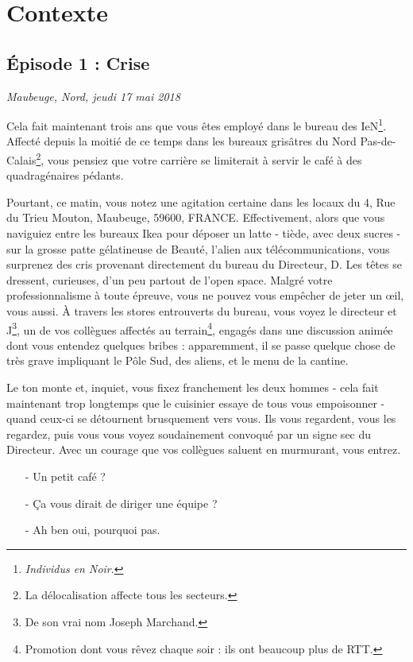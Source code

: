 \newpage

\section{Contexte}
\subsection{Épisode 1 : Crise}
\hfill \textit{Maubeuge, Nord, jeudi 17 mai 2018}

Cela fait maintenant trois ans que vous êtes employé dans le bureau des
IeN\footnote{\emph{Individus en Noir}\texttrademark.}.  Affecté depuis la moitié
de ce temps dans les bureaux grisâtres du Nord Pas-de-Calais\footnote{La
délocalisation affecte tous les secteurs.}, vous pensiez que votre carrière se
limiterait à servir le café à des quadragénaires pédants. 

Pourtant, ce matin, vous notez une agitation certaine dans les locaux du 4, Rue
du Trieu Mouton, Maubeuge, 59600, FRANCE.  Effectivement, alors que vous
naviguiez entre les bureaux Ikea pour déposer un latte - tiède, avec deux sucres
- sur la grosse patte gélatineuse de Beauté, l'alien aux télécommunications,
vous surprenez des cris provenant directement du bureau du Directeur, D. Les
têtes se dressent, curieuses, d'un peu partout de l'open space. Malgré votre
professionnalisme à toute épreuve, vous ne pouvez vous empêcher de jeter un œil,
vous aussi. À travers les stores entrouverts du bureau, vous voyez le directeur
et J\footnote{De son vrai nom Joseph Marchand.}, un de vos collègues affectés au
terrain\footnote{Promotion dont vous rêvez chaque soir : ils ont beaucoup plus
de RTT.}, engagés dans une discussion animée dont vous entendez quelques bribes
: apparemment, il se passe quelque chose de très grave impliquant le Pôle Sud,
des aliens, et le menu de la cantine.

Le ton monte et, inquiet, vous fixez franchement les deux hommes - cela fait
maintenant trop longtemps que le cuisinier essaye de tous vous empoisonner -
quand ceux-ci se détournent brusquement vers vous. Ils vous regardent, vous les
regardez, puis vous vous voyez soudainement convoqué par un signe sec du
Directeur. Avec un courage que vos collègues saluent en murmurant, vous entrez.

\begin{itemize}
\item[-] Un petit café ?
\item[-] Ça vous dirait de diriger une équipe ?
\item[-] Ah ben oui, pourquoi pas.
\end{itemize}

